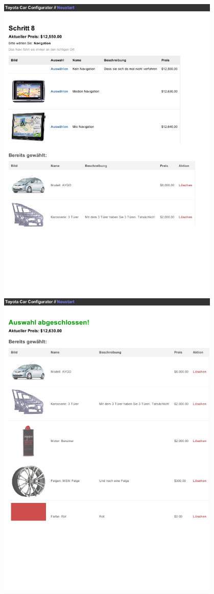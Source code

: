 \documentclass[a4paper,10pt]{article}
\begin{document}
\\
\includegraphics[width=0.8\textwidth]{screenshots/screenshot6.png}
\\
\includegraphics[width=0.8\textwidth]{screenshots/screenshot7.png}
 
\end{document}
